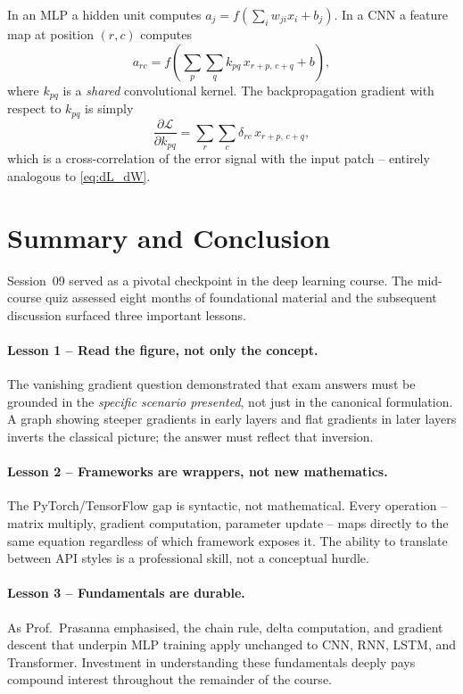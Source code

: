 \documentclass[12pt,a4paper]{article}
\newcommand{\loss}{\mathcal{L}}
\begin{document}
\begin{example}
In an MLP a hidden unit computes
$a_j = f\!\left(\sum_i w_{ji} x_i + b_j\right)$.
In a CNN a feature map at position $(r,c)$ computes
\[
  a_{rc} = f\!\!\left(\sum_{p}\sum_{q} k_{pq}\, x_{r+p,\,c+q} + b\right),
\]
where $k_{pq}$ is a \emph{shared} convolutional kernel.  The
backpropagation gradient with respect to $k_{pq}$ is simply
\[
  \frac{\partial\loss}{\partial k_{pq}}
  = \sum_{r}\sum_{c} \delta_{rc}\, x_{r+p,\,c+q},
\]
which is a cross-correlation of the error signal with the input patch --
entirely analogous to \cref{eq:dL_dW}.
\end{example}

\section{Summary and Conclusion}
\label{sec:conclusion}

Session~09 served as a pivotal checkpoint in the deep learning course.
The mid-course quiz assessed eight months of foundational material and
the subsequent discussion surfaced three important lessons.

\paragraph{Lesson 1 -- Read the figure, not only the concept.}
The vanishing gradient question demonstrated that exam answers must be
grounded in the \emph{specific scenario presented}, not just in the
canonical formulation.  A graph showing steeper gradients in early
layers and flat gradients in later layers inverts the classical picture;
the answer must reflect that inversion.

\paragraph{Lesson 2 -- Frameworks are wrappers, not new mathematics.}
The PyTorch/TensorFlow gap is syntactic, not mathematical.  Every
operation -- matrix multiply, gradient computation, parameter update --
maps directly to the same equation regardless of which framework
exposes it.  The ability to translate between API styles is a
professional skill, not a conceptual hurdle.

\paragraph{Lesson 3 -- Fundamentals are durable.}
As Prof.\ Prasanna emphasised, the chain rule, delta computation, and
gradient descent that underpin MLP training apply unchanged to CNN,
RNN, LSTM, and Transformer.  Investment in understanding these
fundamentals deeply pays compound interest throughout the remainder of
the course.
\end{document}
